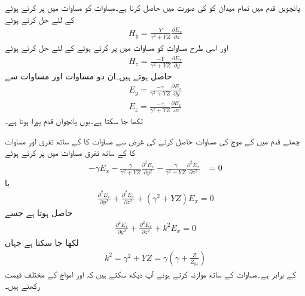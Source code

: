 پانچویں قدم میں تمام میدان کو  کی صورت میں حاصل کرنا ہے۔مساوات  کو مساوات  میں پر کرتے ہوئے   کے لئے حل کرتے ہوئے
\begin{align}
H_y=\frac{Y}{\gamma^2+YZ} \frac{\partial E_x}{\partial z}\label{مساوات_مویج_عرضی_مقناطیسی_برقی_شکل_الف}
\end{align}
اور اسی طرح مساوات  کو مساوات  میں پر کرتے ہوئے   کے لئے حل کرتے ہوئے
\begin{align}
H_z=\frac{-Y}{\gamma^2+YZ} \frac{\partial E_x}{\partial y}\label{مساوات_مویج_عرضی_مقناطیسی_برقی_شکل_ب}
\end{align}
حاصل ہوتے ہیں۔ان دو مساوات اور مساوات  سے 
\begin{align}
E_y=\frac{-\gamma}{\gamma^2+YZ} \frac{\partial E_x}{\partial y} \label{مساوات_مویج_عرضی_مقناطیسی_برقی_شکل_پ}\\
E_z=\frac{-\gamma}{\gamma^2+YZ} \frac{\partial E_x}{\partial z}\label{مساوات_مویج_عرضی_مقناطیسی_برقی_شکل_ت}
\end{align}
لکھا جا سکتا ہے۔یوں پانچواں قدم پورا ہوتا ہے۔

چھٹے قدم میں  کے موج کی مساوات حاصل کرنے کی غرض سے مساوات  کا  کے ساتھ تفرق اور مساوات  کا  کے ساتھ تفرق مساوات  میں پر کرتے ہوئے  
\begin{align*}
-\gamma E_x-\frac{\gamma}{\gamma^2+YZ}\frac{\partial^2 E_x}{\partial y^2}-\frac{\gamma}{\gamma^2+YZ}\frac{\partial^2 E_x}{\partial z^2}&=0  
\end{align*}
یا
\begin{align*}
\frac{\partial^2 E_x}{\partial y^2}+\frac{\partial^2 E_x}{\partial z^2}+(\gamma^2+YZ)E_x=0  
\end{align*}
حاصل ہوتا ہے جسے
\begin{align}\label{مساوات_مویج_عرضی_مقناطیسی_مقداری_موج}
\frac{\partial^2 E_x}{\partial y^2}+\frac{\partial^2 E_x}{\partial z^2}+k^2 E_x=0  
\end{align}
لکھا جا سکتا ہے جہاں
\begin{align}\label{مساوات_مویج_عرضی_مقناطیسی_مستقل_قے_الف}
k^2=\gamma^2+YZ=\gamma\left(\gamma+\frac{Z}{Z_{yz}}\right)
\end{align}
کے برابر ہے۔مساوات  کے ساتھ موازنہ کرتے ہوئے آپ دیکھ سکتے ہیں کہ  اور  امواج کے  مختلف قیمت رکھتے ہیں۔

